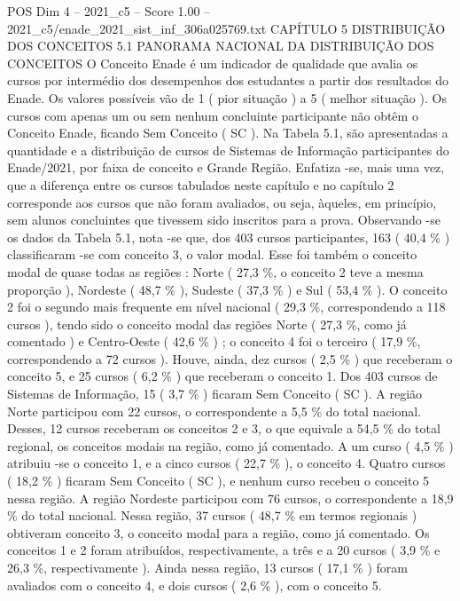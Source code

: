 \begin{textsample}{POS Dim 4 – 2021\_c5 – Score 1.00 – 2021\_c5/enade\_2021\_sist\_inf\_306a025769.txt}  \label{ex:f4_pos_211}
CAPÍTULO 5 DISTRIBUIÇÃO DOS CONCEITOS 5.1 PANORAMA NACIONAL DA DISTRIBUIÇÃO DOS CONCEITOS O Conceito Enade é um indicador de qualidade que avalia os cursos por intermédio dos desempenhos dos estudantes a partir dos resultados do Enade.
Os valores possíveis vão de 1 ( pior situação ) a 5 ( melhor situação ).
Os cursos com apenas um ou sem nenhum concluinte participante não obtêm o Conceito Enade, ficando Sem Conceito ( SC ).
Na Tabela 5.1, são apresentadas a quantidade e a distribuição de cursos de Sistemas de Informação participantes do Enade/2021, por faixa de conceito e Grande Região.
Enfatiza -se, mais uma vez, que a diferença entre os cursos tabulados neste capítulo e no capítulo 2 corresponde aos cursos que não foram avaliados, ou seja, àqueles, em princípio, sem alunos concluintes que tivessem sido inscritos para a prova.
Observando -se os dados da Tabela 5.1, nota -se que, dos 403 cursos participantes, 163 ( 40,4 \% ) classificaram -se com conceito 3, o valor modal.
Esse foi também o conceito modal de quase todas as regiões : Norte ( 27,3 \%, o conceito 2 teve a mesma proporção ), Nordeste ( 48,7 \% ), Sudeste ( 37,3 \% ) e Sul ( 53,4 \% ).
O conceito 2 foi o segundo mais frequente em nível nacional ( 29,3 \%, correspondendo a 118 cursos ), tendo sido o conceito modal das regiões Norte ( 27,3 \%, como já comentado ) e Centro-Oeste ( 42,6 \% ) ; o conceito 4 foi o terceiro ( 17,9 \%, correspondendo a 72 cursos ).
Houve, ainda, dez cursos ( 2,5 \% ) que receberam o conceito 5, e 25 cursos ( 6,2 \% ) que receberam o conceito 1.
Dos 403 cursos de Sistemas de Informação, 15 ( 3,7 \% ) ficaram Sem Conceito ( SC ).
A região Norte participou com 22 cursos, o correspondente a 5,5 \% do total nacional.
Desses, 12 cursos receberam os conceitos 2 e 3, o que equivale a 54,5 \% do total regional, os conceitos modais na região, como já comentado.
A um curso ( 4,5 \% ) atribuiu -se o conceito 1, e a cinco cursos ( 22,7 \% ), o conceito 4.
Quatro cursos ( 18,2 \% ) ficaram Sem Conceito ( SC ), e nenhum curso recebeu o conceito 5 nessa região.
A região Nordeste participou com 76 cursos, o correspondente a 18,9 \% do total nacional.
Nessa região, 37 cursos ( 48,7 \% em termos regionais ) obtiveram conceito 3, o conceito modal para a região, como já comentado.
Os conceitos 1 e 2 foram atribuídos, respectivamente, a três e a 20 cursos ( 3,9 \% e 26,3 \%, respectivamente ).
Ainda nessa região, 13 cursos ( 17,1 \% ) foram avaliados com o conceito 4, e dois cursos ( 2,6 \% ), com o conceito 5.

\end{textsample}
